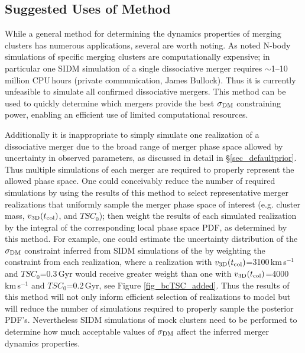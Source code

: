 \documentclass[12pt]{emulateapj}
\begin{document}
\subsection{Suggested Uses of Method}\label{sec_suggestions}

While a general method for determining the dynamics properties of merging clusters has numerous applications, several are worth noting.
As noted N-body simulations of specific merging clusters are computationally expensive; in particular one SIDM simulation of a single dissociative merger requires $\sim$1--10 million CPU\,hours (private communication, James Bullock). 
Thus it is currently unfeasible to simulate all confirmed dissociative mergers.
This method can be used to quickly determine which mergers provide the best $\sigma_{\rm DM}$ constraining power, enabling an efficient use of limited computational resources.

Additionally it is inappropriate to simply simulate one realization of a dissociative merger due to the broad range of merger phase space allowed by uncertainty in observed parameters, as discussed in detail in \S\ref{sec_defaultprior}.
Thus multiple simulations of each merger are required to properly represent the allowed phase space.
One could conceivably reduce the number of required simulations by using the results of this method to select representative merger realizations that uniformly sample the merger phase space of interest (e.g. cluster mass, $v_{\rm 3D}(t_{\rm col})$, and $TSC_0$);
then weight the results of each simulated realization by the integral of the corresponding local phase space PDF, as determined by this method.
For example, one could estimate the uncertainty distribution of the $\sigma_{\rm DM}$ constraint inferred from SIDM simulations of the  by weighting the constraint from each realization, where a realization with  $v_{\rm 3D}(t_{\rm col})$=3100\,km\,s$^{-1}$ and $TSC_0$=0.3\,Gyr would receive greater weight than one with $v_{\rm 3D}(t_{\rm col})$=4000\,km\,s$^{-1}$ and $TSC_0$=0.2\,Gyr, see Figure \ref{fig_bcTSC_added}.
Thus the results of this method will not only inform efficient selection of realizations to model but will reduce the number of simulations required to properly sample the posterior PDF's.
Nevertheless SIDM simulations of mock clusters need to be performed to determine how much acceptable values of $\sigma_{\rm DM}$ affect the inferred merger dynamics properties.
\end{document}
